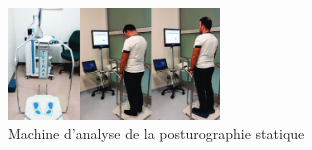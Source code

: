\begin{figure}[ht]
    \centering
    \includegraphics[width=0.5\textwidth]{images/introduction/statique.png}
    \caption{Machine d’analyse de la posturographie statique }
    \label{fig:posturographie-statique}
\end{figure}

